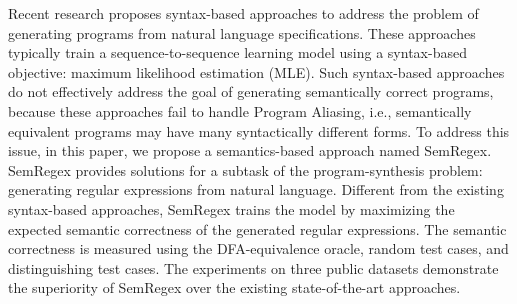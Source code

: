 Recent research proposes syntax-based approaches to address the problem of generating programs from natural language specifications. These approaches typically train a sequence-to-sequence learning model using a syntax-based objective: maximum likelihood estimation (MLE). Such syntax-based approaches do not effectively address the goal of generating semantically correct programs, because these approaches fail to handle Program Aliasing, i.e., semantically equivalent programs may have many syntactically different forms. To address this issue, in this paper, we propose a semantics-based approach named SemRegex. SemRegex provides solutions for a subtask of the program-synthesis problem: generating regular expressions from natural language. Different from the existing syntax-based approaches, SemRegex trains the model by maximizing the expected semantic correctness of the generated regular expressions. The semantic correctness is measured using the DFA-equivalence oracle, random test cases, and distinguishing test cases. The experiments on three public datasets demonstrate the superiority of SemRegex over the existing state-of-the-art approaches.
